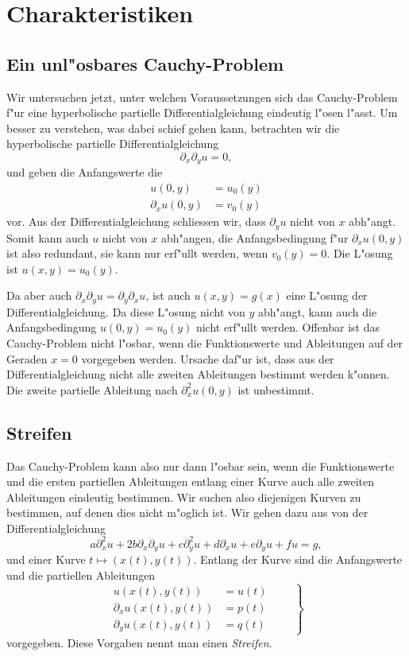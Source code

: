 \section{Charakteristiken}
\subsection{Ein unl"osbares Cauchy-Problem}
Wir untersuchen jetzt, unter welchen Voraussetzungen sich das Cauchy-Problem
f"ur eine hyperbolische partielle Differentialgleichung eindeutig l"osen l"asst.
Um besser zu verstehen, was dabei schief gehen kann, betrachten wir die
hyperbolische partielle Differentialgleichung
\[
\partial_x\partial_y u=0,
\]
und geben die Anfangswerte die
\begin{align*}
u(0,y)&=u_0(y)
\\
\partial_xu(0,y)&=v_0(y)
\end{align*}
vor.
Aus der Differentialgleichung schliessen wir, dass $\partial_y u$
nicht von $x$ abh"angt. Somit kann auch $u$ nicht von $x$ abh"angen,
die Anfangsbedingung f"ur $\partial_xu(0,y)$ ist also redundant,
sie kann nur erf"ullt werden, wenn $v_0(y)=0$.
Die L"osung ist $u(x,y)=u_0(y)$.

Da aber auch $\partial_x\partial_yu=\partial_y\partial_xu$, ist auch
$u(x,y)=g(x)$ eine L"osung der Differentialgleichung. Da diese
L"osung nicht von $y$ abh"angt, kann auch die Anfangsbedingung $u(0,y)=u_0(y)$
nicht erf"ullt werden. Offenbar ist das Cauchy-Problem nicht l"osbar, wenn die
Funktionswerte und Ableitungen auf der Geraden $x=0$ vorgegeben werden.
Ursache daf"ur ist, dass aus der Differentialgleichung nicht alle zweiten
Ableitungen bestimmt werden k"onnen. Die zweite partielle Ableitung
nach $\partial_x^2u(0,y)$ ist unbestimmt.

\subsection{Streifen}
Das Cauchy-Problem kann also nur dann l"osbar sein, wenn die Funktionswerte
und die ersten partiellen Ableitungen entlang einer Kurve
auch alle zweiten Ableitungen eindeutig bestimmen. Wir suchen also
diejenigen Kurven zu bestimmen, auf denen dies nicht m"oglich ist.
Wir gehen dazu aus von der Differentialgleichung
\begin{equation}
a\partial_x^2u+2b\partial_x\partial_yu+c\partial_y^2u+d\partial_xu+e\partial_yu+fu=g,
\label{charequation}
\end{equation}
und einer Kurve
$t\mapsto(x(t),y(t))$. Entlang der Kurve sind die Anfangswerte
und die partiellen Ableitungen
\begin{equation}
\left.
\begin{aligned}
u(x(t),y(t))&=u(t)\\
\partial_xu(x(t),y(t))&=p(t)\\
\partial_yu(x(t),y(t))&=q(t)
\end{aligned}
\qquad
\right\}
\label{charanfangs}
\end{equation}
vorgegeben. Diese Vorgaben nennt man einen {\it Streifen}.


